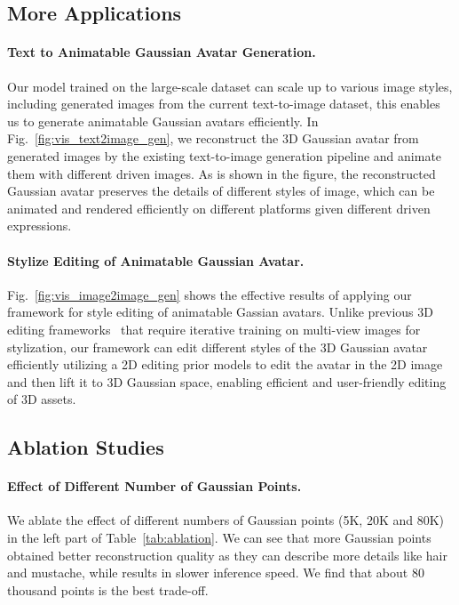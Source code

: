 \subsection{More Applications}

\paragraph{\textbf{Text to Animatable Gaussian Avatar Generation.}}
Our model trained on the large-scale dataset can scale up to various image styles, including generated images from the current text-to-image dataset, this enables us to generate animatable Gaussian avatars efficiently. In Fig.~\ref{fig:vis_text2image_gen}, we reconstruct the 3D Gaussian avatar from generated images by the existing text-to-image generation pipeline and animate them with different driven images. As is shown in the figure, the reconstructed Gaussian avatar preserves the details of different styles of image, which can be animated and rendered efficiently on different platforms given different driven expressions.
 
\paragraph{\textbf{Stylize Editing of Animatable Gaussian Avatar.}}
Fig.~\ref{fig:vis_image2image_gen} shows the effective results of applying our framework for style editing of animatable Gassian avatars. Unlike previous 3D editing frameworks~\cite{IN2NICCV,FreditorECCV,GaussianEditor} that require iterative training on multi-view images for stylization, our framework can edit different styles of the 3D Gaussian avatar efficiently utilizing a 2D editing prior models to edit the avatar in the 2D image and then lift it to 3D Gaussian space, enabling efficient and user-friendly editing of 3D assets. 

\subsection{Ablation Studies}

\paragraph{\textbf{Effect of Different Number of Gaussian Points.}}
We ablate the effect of different numbers of Gaussian points (5K, 20K and 80K) in the left part of Table~\ref{tab:ablation}. We can see that more Gaussian points obtained better reconstruction quality as they can describe more details like hair and mustache, while results in slower inference speed. We find that about 80 thousand points is the best trade-off.

